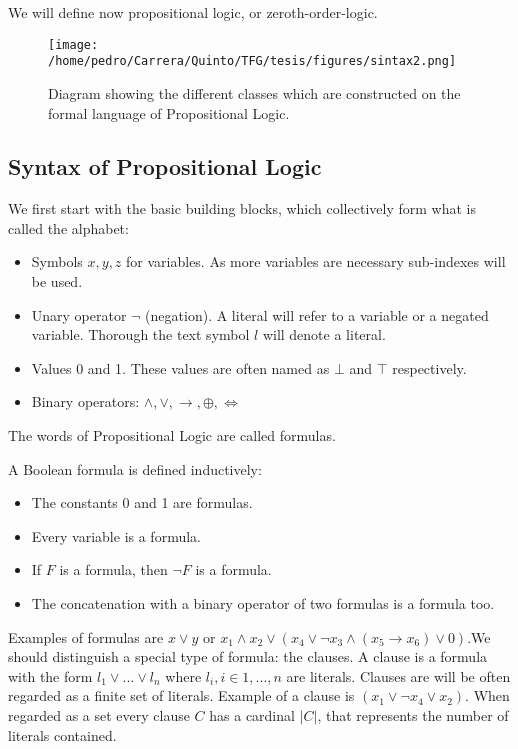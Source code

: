We will define now propositional logic, or zeroth-order-logic. \\

\begin{figure}[h]
  \begin{center}
    \texttt{[image: /home/pedro/Carrera/Quinto/TFG/tesis/figures/sintax2.png]}
    \caption{Diagram showing the different classes which are constructed on the formal language of Propositional Logic.}
  \end{center}
\end{figure} 

\subsection{Syntax of Propositional Logic}
We first start with the basic building blocks, which collectively form what is called the alphabet:
\begin{itemize}
\item Symbols $x,y,z$ for variables. As more variables are necessary sub-indexes will be used.
\item Unary operator $\neg$ (negation). A literal will refer to a variable or a negated variable. Thorough the text symbol $l$ will denote a literal. 
  
\item Values 0 and 1. These values are often named as $\bot$ and $\top$ respectively.

\item Binary operators: $\wedge, \vee, \rightarrow, \oplus, \iff $
\end{itemize}


The words of Propositional Logic are called formulas.
\begin{definition}
  A Boolean formula is defined inductively:
  \begin{itemize}
  \item The constants 0 and 1 are formulas.
  \item Every variable is a formula.
  \item If $F$ is a formula, then $\neg  F$ is a formula.
  \item The concatenation with a binary operator of two formulas is a formula too.\\
  \end{itemize}
\end{definition}

Examples of formulas are $x\vee y$ or $x_1\wedge x_2 \vee  ( x_4 \vee \neg  x_3 \wedge (x_5\to x_6) \vee 0 )$.We should distinguish a special type of formula: the clauses. A clause  is a formula with the form $l_1\vee ... \vee l_n$ where $l_i, i \in 1,...,n$ are literals. Clauses are will be often regarded as a finite set of literals. Example of a clause is $(x_1\vee \neg x_4 \vee x_2)$. When regarded as a set every clause $C$ has a cardinal $|C|$, that represents the number of literals contained. \\

